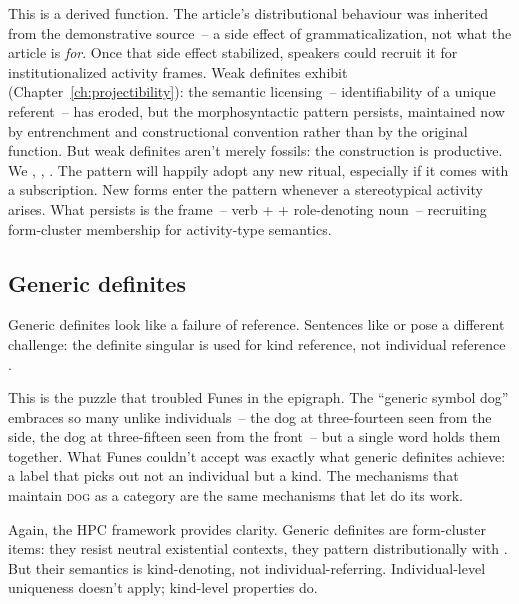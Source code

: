 This is a derived function. The article's distributional behaviour was inherited from the demonstrative source~-- a side effect of grammaticalization, not what the article is \emph{for}. Once that side effect stabilized, speakers could recruit it for institutionalized activity frames. Weak definites exhibit  (Chapter~\ref{ch:projectibility}): the semantic licensing~-- identifiability of a unique referent~-- has eroded, but the morphosyntactic pattern persists, maintained now by entrenchment and constructional convention rather than by the original function. But weak definites aren't merely fossils: the construction is productive. We , , . The pattern will happily adopt any new ritual, especially if it comes with a subscription. New forms enter the pattern whenever a stereotypical activity arises. What persists is the frame~-- verb +  + role-denoting noun~-- recruiting form-cluster membership for activity-type semantics.

\subsection{Generic definites}
\label{sec:10:generic-definites}

Generic definites look like a failure of reference. Sentences like  or  pose a different challenge: the definite singular is used for kind reference, not individual reference \citep{carlson1977,krifka2004}.

This is the puzzle that troubled Funes in the epigraph. The \enquote{generic symbol dog} embraces so many unlike individuals~-- the dog at three-fourteen seen from the side, the dog at three-fifteen seen from the front~-- but a single word holds them together. What Funes couldn't accept was exactly what generic definites achieve: a label that picks out not an individual but a kind. The mechanisms that maintain \textsc{dog} as a category are the same mechanisms that let  do its work.

Again, the HPC framework provides clarity. Generic definites are form-cluster items: they resist neutral existential contexts, they pattern distributionally with . But their semantics is kind-denoting, not individual-referring. Individual-level uniqueness doesn't apply; kind-level properties do.

